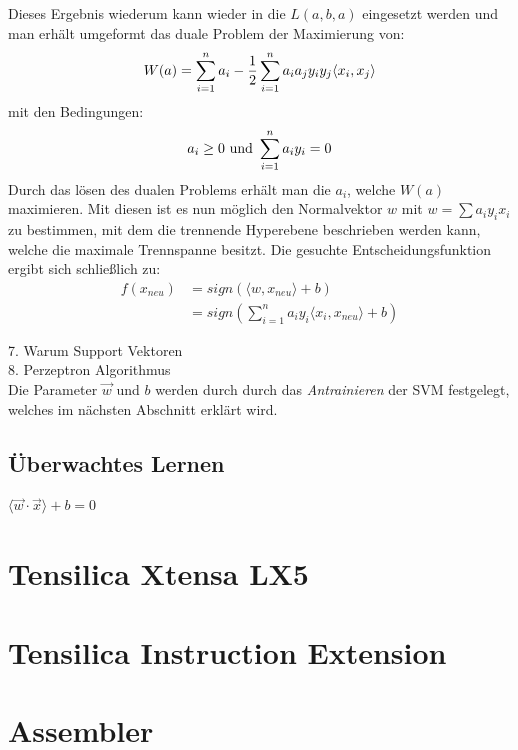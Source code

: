 Dieses Ergebnis wiederum kann wieder in die $L(a,b,a)$ eingesetzt werden und man erhält umgeformt das duale Problem der Maximierung von:
\begin{align}
W(a)=\sum\limits_{i=1}^n a_i - \frac{1}{2}\sum\limits_{i=1}^n a_i a_j y_i y_j \langle x_i,x_j \rangle\notag
\end{align}
mit den Bedingungen:
\begin{align}
a_i \geq 0 \text{ und } \sum\limits_{i=1}^n a_i y_i =0\notag
\end{align}
Durch das lösen des dualen Problems erhält man die $a_i$, welche $W(a)$ maximieren. Mit diesen ist es nun möglich den Normalvektor $w$ mit $w=\sum a_i y_i x_i$ zu bestimmen, mit dem die trennende Hyperebene beschrieben werden kann, welche die maximale Trennspanne besitzt. Die gesuchte Entscheidungsfunktion ergibt sich schließlich zu:
\begin{align}
f(x_{neu})&=sign(\langle w,x_{neu} \rangle + b)\\
&=sign(\sum\limits_{i=1}^n a_i y_i \langle x_i,x_{neu} \rangle +b)
\end{align}

7. Warum Support Vektoren\\
8. Perzeptron Algorithmus\\


Die Parameter $\vec{w}$ und $b$ werden durch durch das \emph{Antrainieren} der SVM festgelegt, welches im nächsten Abschnitt erklärt wird.

\subsection{Überwachtes Lernen}





$\langle\vec{w}\cdot\vec{x}\rangle+b=0$









\section{Tensilica Xtensa LX5}
\label{sec:grundlagenlx5}

\section{Tensilica Instruction Extension}
\label{sec:grundlagentie}

\section{Assembler}
\label{sec:grundlagenassembler}